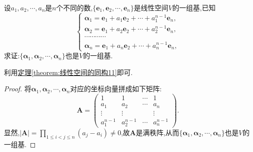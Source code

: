 \documentclass[../../main.tex]{subfiles}%
\begin{document}
\begin{example}\label{example:3.110.1}
设\(a_1,a_2,\cdots,a_n\)是\(n\)个不同的数,\(\{\boldsymbol{e}_1,\boldsymbol{e}_2,\cdots,\boldsymbol{e}_n\}\)是线性空间\(V\)的一组基,已知
\[
\begin{cases}
\boldsymbol{\alpha}_1=\boldsymbol{e}_1 + a_1\boldsymbol{e}_2+\cdots + a_1^{n - 1}\boldsymbol{e}_n,\\
\boldsymbol{\alpha}_2=\boldsymbol{e}_1 + a_2\boldsymbol{e}_2+\cdots + a_2^{n - 1}\boldsymbol{e}_n,\\
\cdots\cdots\cdots\cdots\\
\boldsymbol{\alpha}_n=\boldsymbol{e}_1 + a_n\boldsymbol{e}_2+\cdots + a_n^{n - 1}\boldsymbol{e}_n,
\end{cases}
\]
求证:\(\{\boldsymbol{\alpha}_1,\boldsymbol{\alpha}_2,\cdots,\boldsymbol{\alpha}_n\}\)也是\(V\)的一组基.
\end{example}
\begin{note}
利用\hyperref[theorem:线性空间的同构11]{定理\ref{theorem:线性空间的同构11}}即可.
\end{note}
\begin{proof}
将\(\boldsymbol{\alpha}_1,\boldsymbol{\alpha}_2,\cdots,\boldsymbol{\alpha}_n\)对应的坐标向量拼成如下矩阵:
\[
\boldsymbol{A}=\begin{pmatrix}
1&1&\cdots&1\\
a_1&a_2&\cdots&a_n\\
\vdots&\vdots&&\vdots\\
a_1^{n - 1}&a_2^{n - 1}&\cdots&a_n^{n - 1}
\end{pmatrix}.
\]
显然,\(|\boldsymbol{A}|=\prod_{1\leqslant  i<j\leqslant  n}(a_j - a_i)\neq0\),故\(\boldsymbol{A}\)是满秩阵,从而\(\{\boldsymbol{\alpha}_1,\boldsymbol{\alpha}_2,\cdots,\boldsymbol{\alpha}_n\}\)也是\(V\)的一组基. 
\end{proof}
\end{document}
